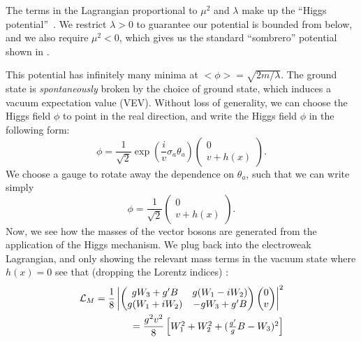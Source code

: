 The terms in the Lagrangian  proportional to $\mu^2$ and $\lambda$ make up the ``Higgs potential''~\cite{Higgs:1964pj}.
We restrict $\lambda > 0$ to guarantee our potential is bounded from below, and we also require $\mu^2 < 0$, which gives us the standard ``sombrero'' potential shown in .

This potential has infinitely many minima at $<\phi> = \sqrt{2m/\lambda}$.
The ground state is \textit{spontaneously} broken by the choice of ground state, which induces a vacuum expectation value (VEV).
Without loss of generality, we can choose the Higgs field $\phi$ to point in the real direction, and write the Higgs field $\phi$ in the following form:
\begin{equation}
\phi = \frac{1}{\sqrt{2}} \exp( \frac{i}{v} \sigma_a \theta_a ) \begin{pmatrix} 0 \\ v + h(x) \end{pmatrix}.
\end{equation}
We choose a gauge to rotate away the dependence on $\theta_a$, such that we can write simply
\begin{equation}
\label{eq:higgs_field_after_ssb}
\phi = \frac{1}{\sqrt{2}} \begin{pmatrix} 0 \\ v + h(x) \end{pmatrix}.
\end{equation}
Now, we see how the masses of the vector bosons are generated from the application of the Higgs mechanism.
We plug  back into the electroweak Lagrangian, and only showing the relevant mass terms in the vacuum state where $h(x) = 0$  see that (dropping the Lorentz indices) :
\begin{align}
\mathcal{L}_M = \frac{1}{8} \begin{vmatrix} \begin{pmatrix} gW_3 + g'B & g(W_1 - iW_2)\\ g(W_1 + iW_2) & -gW_3 + g'B \end{pmatrix}  \begin{pmatrix} 0  \\ v \end{pmatrix} \end{vmatrix}^2\\ = \frac{g^2 v^2}{8} \begin{bmatrix} W_1^2 + W_2^2 + (\frac{g'}{g}B - W_3)^2 \end{bmatrix} \notag
\end{align}
